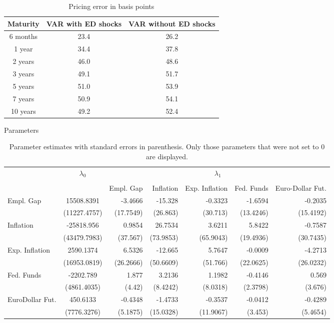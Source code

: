 \documentclass{article}
\numberwithin{equation}{section}
\begin{document}
\begin{table}
\begin{center}
\begin{tabular}{|c|c|c|}
    \hline
    \textbf{Maturity} & \textbf{VAR with ED shocks} & \textbf{VAR without ED
    shocks}\\ \hline
    6 months  & 23.4 & 26.2 \\ \hline
    1 year    & 34.4 & 37.8 \\ \hline
    2 years   & 46.0 & 48.6 \\ \hline
    3 years   & 49.1 & 51.7 \\ \hline
    5 years   & 51.0 & 53.9 \\ \hline
    7 years   & 50.9 & 54.1 \\ \hline
    10 years  & 49.2 & 52.4 \\ \hline
\end{tabular}
\end{center}
\label{tab:2}
\caption{Pricing error in basis points}
\end{table}

Parameters

\begin{table}
  \centering
  \begin{tabular}{lcrrrrr}
    \toprule
    & $\lambda_0$ &\multicolumn{5}{c}{$\lambda_1$} \\
    \cmidrule{2-2} \cmidrule(l){3-7} \\
    &  & Empl. Gap & Inflation & Exp. Inflation & Fed. Funds
    & Euro-Dollar Fut. \\
    Empl. Gap       & 15508.8391    &-3.4666 &-15.328 &-0.3323 &-1.6594 &-0.2035 \\
                    & (11227.4757)  &(17.7549) &(26.863) &(30.713) &(13.4246)
                    &(15.4192) \\ %
    Inflation       &  -25818.956   &0.9854 &26.7534 &3.6211 &5.8422 &-0.7587 \\
                    & (43479.7983)  &(37.567) &(73.9853) &(65.9043) &(19.4936) &(30.7435) \\
    Exp. Inflation  &  2590.1374    &6.5326 &-12.665 &5.7647 &-0.0009 &-4.2713 \\
                    & (16953.0819)  &(26.2666) &(50.6609) &(51.766) &(22.0625) &(26.0232) \\
    Fed. Funds      & -2202.789     &1.877 &3.2136 &1.1982 &-0.4146 &0.569\\
                    & (4861.4035)   &(4.42) &(8.4242) &(8.0318) &(2.3798) &(3.676) \\
    EuroDollar Fut. & 450.6133      &-0.4348        &-1.4733 &-0.3537 &-0.0412 &-0.4289 \\
                    & (7776.3276)   &(5.1875) &(15.0328) &(11.9067) &(3.453) &(5.4654) \\
    \bottomrule
  \end{tabular}
  \caption{Parameter estimates with standard errors in parenthesis. Only those
  parameters that were not set to 0 are displayed.}
  \label{tab:3}
\end{table}
\end{document}
